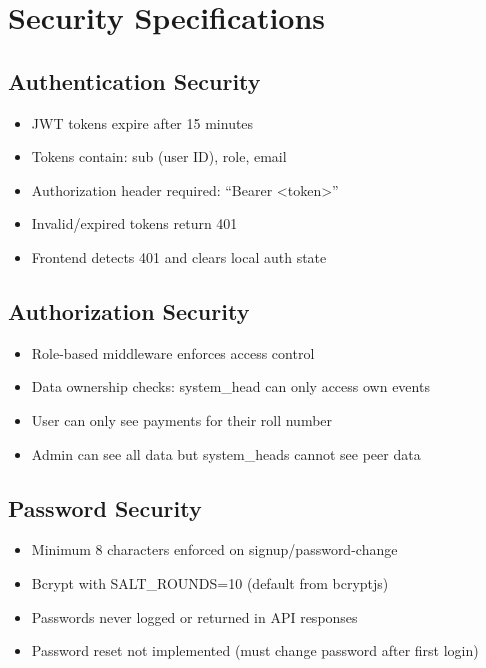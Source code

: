 \documentclass[12pt,a4paper]{article}
\begin{document}
\section{Security Specifications}

\subsection{Authentication Security}
\begin{itemize}
  \item JWT tokens expire after 15 minutes
  \item Tokens contain: sub (user ID), role, email
  \item Authorization header required: ``Bearer <token>''
  \item Invalid/expired tokens return 401
  \item Frontend detects 401 and clears local auth state
\end{itemize}

\subsection{Authorization Security}
\begin{itemize}
  \item Role-based middleware enforces access control
  \item Data ownership checks: system\_head can only access own events
  \item User can only see payments for their roll number
  \item Admin can see all data but system\_heads cannot see peer data
\end{itemize}

\subsection{Password Security}
\begin{itemize}
  \item Minimum 8 characters enforced on signup/password-change
  \item Bcrypt with SALT\_ROUNDS=10 (default from bcryptjs)
  \item Passwords never logged or returned in API responses
  \item Password reset not implemented (must change password after first login)
\end{itemize}
\end{document}
